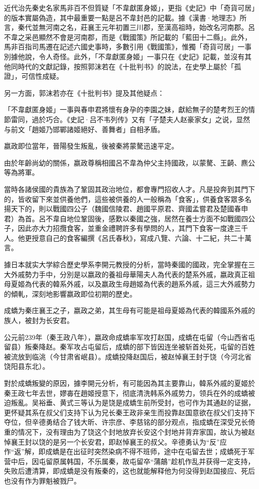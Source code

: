 近代治先秦史名家馬非百不但質疑「不韋獻匿身姬」，更指《史記》中「奇貨可居」的版本實屬偽造，其中最重要一點是呂不韋封邑的記載。據《漢書·地理志》所言，秦代並無河南之名，莊襄王元年初置三川郡，至漢高祖時，始改名河南郡。呂不韋之采邑顯然不會是河南郡，而是《戰國策》所記載的「藍田十二縣」。此外，馬非百指司馬遷在記述六國史事時，多數引用《戰國策》，惟獨「奇貨可居」一事別據他說，令人奇怪。此外，「不韋獻匿身姬」一事只在《史記》記載，並沒有其他同時代的文獻記錄，按照郭沫若在《十批判书》的說法，在史學上屬於「孤證」，可信性成疑。

另一方面，郭沫若亦在《十批判书》提及其他疑点：

「不韋獻匿身姬」一事與春申君將懷有身孕的李園之妹，獻給無子的楚考烈王的情節雷同，過於巧合。《史記·吕不韦列传》又有「子楚夫人赵豪家女」之说，显然与前文「趙姬乃邯鄲諸姬絕好、善舞者」自相矛盾。

嬴政即位當年，晉陽發生叛亂，後被秦將蒙驁迅速平定。

由於年齡尚幼的關係，嬴政尊稱相國呂不韋為仲父主持國政，以蒙驁、王齮、麃公等為將軍。

當時各諸侯國的貴族為了鞏固其政治地位，都會專門招收人才。凡是投奔到其門下的，皆收留下來並供養他們，這些被供養的人一般稱為「食客」，供養食客眾多名揚天下的，則以戰國四公子（魏國信陵君、趙國平原君、齊國孟嘗君及楚國春申君）為首。呂不韋自地位鞏固後，感歎以秦國之強，居然在養士方面不如戰國四公子，因此亦大力招攬食客，並重金禮聘許多有學問的人，其門下食客一度達三千人。他更授意自己的食客編撰《呂氏春秋》，寫成八覽、六論、十二紀，共二十萬言。

據日本就实大学綜合歷史學系李開元教授的分析，當時秦國的國政，完全掌握在三大外戚勢力手中，分別是以嬴政的養祖母華陽夫人為代表的楚系外戚，嬴政真正祖母夏姬為代表的韓系外戚，以及嬴政生母趙姬為代表的趙系外戚，這三大外戚勢力的傾軋，深刻地影響嬴政即位初期的歷史。

成蟜为秦庄襄王之子，嬴政之弟，其生母有可能是祖母夏姬為代表的韓國系外戚的族人，被封为长安君。

公元前239年（秦王政八年），嬴政命成蟜率军攻打赵国，成蟜在屯留（今山西省屯留县）叛秦降赵。秦军攻占屯留后，成蟜的部下皆因连坐被斩首处死，屯留的百姓被流放到临洮（今甘肃省岷县）。成蟜投降赵国后，被赵悼襄王封于饶（今河北省饶阳县东北）。

對於成蟜叛變的原因，據李開元分析，有可能因為其主要靠山，韓系外戚的夏姬於秦王政七年去世，嫪毐在趙姬授意下，彻底清洗韩系外戚势力，领兵在外的成蟜被迫叛亂。吴裕垂、黄式三等认为是饶是成蟜生前所受封，也可作为其通赵的证据，更怀疑其系在叔父们支持下认为兄长秦王政非亲生而投靠赵国意欲在叔父们支持下夺位，但辛德勇结合了钱大昕、许宗彦、李慈铭的部分观点，指成蟜在深受兄长倚重的情况下，没有理由为了饶这个封地放弃长安这个封地并背弃家国，故认为被赵悼襄王封以饶的是另一个长安君，即赵悼襄王的叔父。辛德勇认为“反”应作“返”解，即成蟜是在出征时突然染病不得不班师，途中在屯留去世；成蟜死于军营中后，因屯留原属韩国，不乐属秦，故屯留卒“蒲鶮”趁机作乱并获得一定支持，失败后遭清算，即成蟜是没有叛秦的，这也就能解释他为何没得到赵国接应、死后也没有作为罪魁被戮尸。

